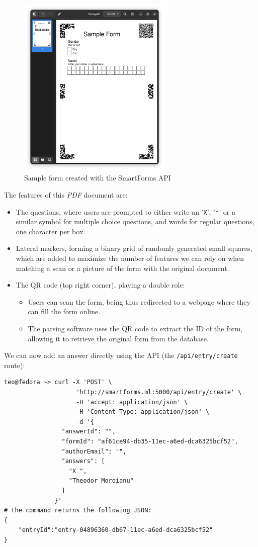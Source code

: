 \documentclass[11pt, a4paper]{report}
\def\code#1{\texttt{#1}}
\begin{document}
\begin{figure}[!h]
    \centering
    \includegraphics[width=20em]{images/screenshoots/sample_form.png}
    \caption{Sample form created with the SmartForms API}
    \label{simple-form-preview}
\end{figure}

The features of this \textit{PDF} document are:
\begin{itemize}
    \item The questions, where users are prompted to either write an '\code{X}', '\code{*}' or a similar symbol for multiple choice questions, and words for regular questions, one character per box.
    \item Lateral markers, forming a binary grid of randomly generated small squares, which are added to maximize the number of features we can rely on when matching a scan or a picture of the form with the original document.
    \item The QR code (top right corner), playing a double role:
    \begin{itemize}
        \item Users can scan the form, being thus redirected to a webpage where they can fill the form online.
        \item The parsing software uses the QR code to extract the ID of the form, allowing it to retrieve the original form from the database.
    \end{itemize}
\end{itemize}

We can now add an answer directly using the API (the \code{/api/entry/create} route):

\begin{verbatim}
teo@fedora ~> curl -X 'POST' \
                    'http://smartforms.ml:5000/api/entry/create' \
                    -H 'accept: application/json' \
                    -H 'Content-Type: application/json' \
                    -d '{
                "answerId": "",
                "formId": "af61ce94-db35-11ec-a6ed-dca6325bcf52",
                "authorEmail": "",
                "answers": [
                  "X ",
                  "Theodor Moroianu"
                ]
              }'
# the command returns the following JSON:
{
    "entryId":"entry-04896360-db67-11ec-a6ed-dca6325bcf52"
}
\end{verbatim}
\end{document}
